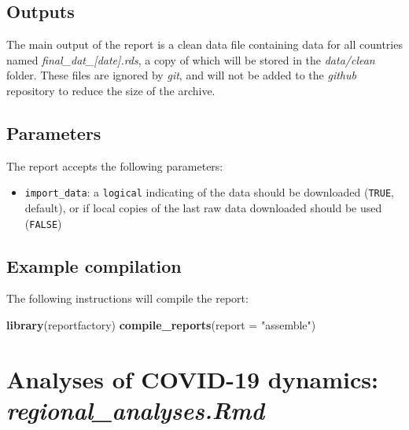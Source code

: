 \documentclass[]{book}
\newenvironment{Shaded}{\begin{snugshade}}{\end{snugshade}}
\newcommand{\DataTypeTok}[1]{\textcolor[rgb]{0.13,0.29,0.53}{#1}}
\newcommand{\KeywordTok}[1]{\textcolor[rgb]{0.13,0.29,0.53}{\textbf{#1}}}
\newcommand{\NormalTok}[1]{#1}
\newcommand{\StringTok}[1]{\textcolor[rgb]{0.31,0.60,0.02}{#1}}
\providecommand{\tightlist}{%
  \setlength{\itemsep}{0pt}\setlength{\parskip}{0pt}}
\begin{document}
\hypertarget{outputs}{%
\subsection{Outputs}\label{outputs}}

The main output of the report is a clean data file containing data for all
countries named \emph{final\_dat\_{[}date{]}.rds}, a copy of which will be stored in the
\emph{data/clean} folder. These files are ignored by \emph{git}, and will not be added to
the \emph{github} repository to reduce the size of the archive.

\hypertarget{parameters}{%
\subsection{Parameters}\label{parameters}}

The report accepts the following parameters:

\begin{itemize}
\tightlist
\item
  \texttt{import\_data}: a \texttt{logical} indicating of the data should be downloaded
  (\texttt{TRUE}, default), or if local copies of the last raw data downloaded should
  be used (\texttt{FALSE})
\end{itemize}

\hypertarget{example-compilation}{%
\subsection{Example compilation}\label{example-compilation}}

The following instructions will compile the report:

\begin{Shaded}
\begin{Highlighting}[]

\KeywordTok{library}\NormalTok{(reportfactory)}
\KeywordTok{compile_reports}\NormalTok{(}\DataTypeTok{report =} \StringTok{"assemble"}\NormalTok{)}
\end{Highlighting}
\end{Shaded}

\hypertarget{analyses-of-covid-19-dynamics-regional_analyses.rmd}{%
\section{\texorpdfstring{Analyses of COVID-19 dynamics: \emph{regional\_analyses.Rmd}}{Analyses of COVID-19 dynamics: regional\_analyses.Rmd}}\label{analyses-of-covid-19-dynamics-regional_analyses.rmd}}
\end{document}
